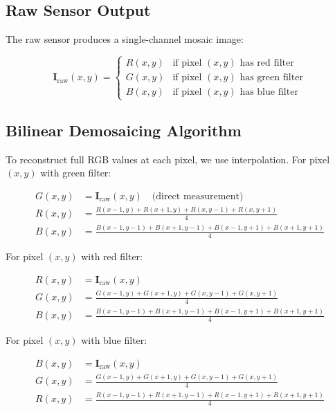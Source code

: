 \documentclass[11pt,a4paper]{article}
\newcommand{\mat}[1]{\mathbf{#1}}
\begin{document}
\subsection{Raw Sensor Output}

The raw sensor produces a single-channel mosaic image:

\begin{equation}
\mat{I}_{\text{raw}}(x, y) = \begin{cases}
R(x, y) & \text{if pixel } (x,y) \text{ has red filter} \\
G(x, y) & \text{if pixel } (x,y) \text{ has green filter} \\
B(x, y) & \text{if pixel } (x,y) \text{ has blue filter}
\end{cases}
\end{equation}

\subsection{Bilinear Demosaicing Algorithm}

To reconstruct full RGB values at each pixel, we use interpolation. For pixel $(x, y)$ with green filter:

\begin{align}
G(x, y) &= \mat{I}_{\text{raw}}(x, y) \quad \text{(direct measurement)} \\
R(x, y) &= \frac{R(x-1, y) + R(x+1, y) + R(x, y-1) + R(x, y+1)}{4} \\
B(x, y) &= \frac{B(x-1, y-1) + B(x+1, y-1) + B(x-1, y+1) + B(x+1, y+1)}{4}
\end{align}

For pixel $(x, y)$ with red filter:

\begin{align}
R(x, y) &= \mat{I}_{\text{raw}}(x, y) \\
G(x, y) &= \frac{G(x-1, y) + G(x+1, y) + G(x, y-1) + G(x, y+1)}{4} \\
B(x, y) &= \frac{B(x-1, y-1) + B(x+1, y-1) + B(x-1, y+1) + B(x+1, y+1)}{4}
\end{align}

For pixel $(x, y)$ with blue filter:

\begin{align}
B(x, y) &= \mat{I}_{\text{raw}}(x, y) \\
G(x, y) &= \frac{G(x-1, y) + G(x+1, y) + G(x, y-1) + G(x, y+1)}{4} \\
R(x, y) &= \frac{R(x-1, y-1) + R(x+1, y-1) + R(x-1, y+1) + R(x+1, y+1)}{4}
\end{align}
\end{document}
